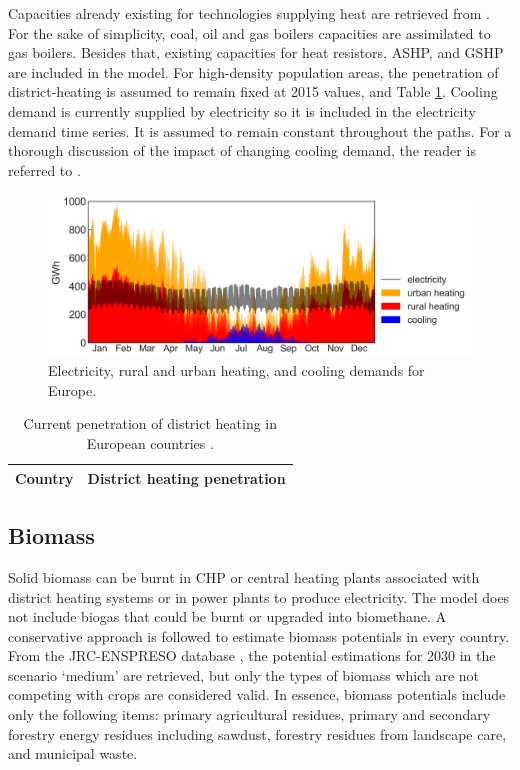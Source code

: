\documentclass[3p]{elsarticle} %
\begin{document}
Capacities already existing for technologies supplying heat are retrieved from \cite{heating_capacities}. For the sake of simplicity, coal, oil and gas boilers capacities are assimilated to gas boilers. Besides that, existing capacities for heat resistors, ASHP, and GSHP are included in the model. For high-density population areas, the penetration of district-heating is assumed to remain fixed at 2015 values, \cite{DH_penetration} and Table \ref{tab_DH_penetration}. Cooling demand is currently supplied by electricity so it is included in the electricity demand time series. It is assumed to remain constant throughout the paths. For a thorough discussion of the impact of changing cooling demand, the reader is referred to \cite{Zhu_2020}.


\begin{figure}[!h]
	\centering
	\includegraphics[width=0.9\columnwidth]{figures/demands.png}
	\caption{Electricity, rural and urban heating, and cooling demands for Europe.} \label{fig_demands} 
\end{figure}



\begin{table}[!h]
\footnotesize
\centering
\begin{threeparttable}
\caption{Current penetration of district heating in European countries \cite{DH_penetration}.} \label{tab_DH_penetration}
\centering
\begin{tabularx}{5.5cm}{lc}
\toprule
Country & District heating penetration  \\
\midrule

\bottomrule
\end{tabularx}
\end{threeparttable}
\end{table}


\subsection{Biomass}
Solid biomass can be burnt in CHP or central heating plants associated with district heating systems or in power plants to produce electricity. The model does not include biogas that could be burnt or upgraded into biomethane. A conservative approach is followed to estimate biomass potentials in every country. From the JRC-ENSPRESO database \cite{JRC_biomass, ENSPRESO}, the potential estimations for 2030 in the scenario `medium' are retrieved, but only the types of biomass which are not competing with crops are considered valid. In essence, biomass potentials include only the following items: primary agricultural residues, primary and secondary forestry energy residues including sawdust, forestry residues from landscape care, and municipal waste.
\end{document}
